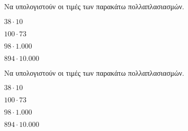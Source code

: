 Να υπολογιστούν οι τιμές των παρακάτω πολλαπλασιασμών.
\begin{multicols}{2}
\begin{rlist}
\item $ 38\cdot10  $
\item $ 100\cdot73 $
\item $ 98\cdot1.000 $
\item $ 894\cdot10.000 $
\end{rlist}
\end{multicols}
Να υπολογιστούν οι τιμές των παρακάτω πολλαπλασιασμών.
\begin{multicols}{2}
\begin{rlist}
\item $ 38\cdot10  $
\item $ 100\cdot73 $
\item $ 98\cdot1.000 $
\item $ 894\cdot10.000 $
\end{rlist}
\end{multicols}
